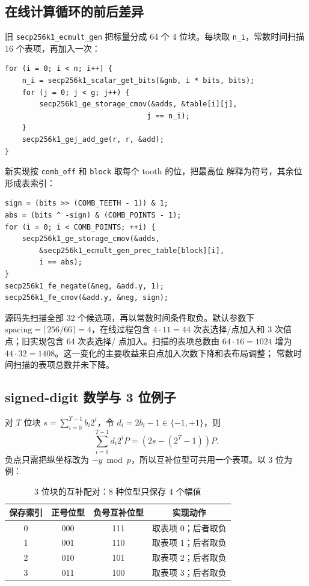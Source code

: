 \documentclass[UTF8,a4paper,zihao=-4]{ctexart}
\begin{document}
\subsection{在线计算循环的前后差异}

旧 \texttt{secp256k1\_ecmult\_gen} 把标量分成 64 个 4 位块。每块取
\texttt{n\_i}，常数时间扫描 16 个表项，再加入一次：

\begin{lstlisting}[style=CStyle,caption={合入前 ecmult\_gen 的核心循环（源码摘录）}]
for (i = 0; i < n; i++) {
    n_i = secp256k1_scalar_get_bits(&gnb, i * bits, bits);
    for (j = 0; j < g; j++) {
        secp256k1_ge_storage_cmov(&adds, &table[i][j],
                                 j == n_i);
    }
    secp256k1_gej_add_ge(r, r, &add);
}
\end{lstlisting}

新实现按 \texttt{comb\_off} 和 \texttt{block} 取每个 tooth 的位，把最高位
解释为符号，其余位形成表索引：

\begin{lstlisting}[style=CStyle,caption={合入后 signed-digit 查表的关键源码}]
sign = (bits >> (COMB_TEETH - 1)) & 1;
abs = (bits ^ -sign) & (COMB_POINTS - 1);
for (i = 0; i < COMB_POINTS; ++i) {
    secp256k1_ge_storage_cmov(&adds,
        &secp256k1_ecmult_gen_prec_table[block][i],
        i == abs);
}
secp256k1_fe_negate(&neg, &add.y, 1);
secp256k1_fe_cmov(&add.y, &neg, sign);
\end{lstlisting}

源码先扫描全部 32 个候选项，再以常数时间条件取负。默认参数下
\(\mathrm{spacing}=\lceil256/66\rceil=4\)，在线过程包含
\(4\cdot11=44\) 次表选择/点加入和 3 次倍点；旧实现包含 64 次表选择/
点加入。扫描的表项总数由 \(64\cdot16=1024\) 增为
\(44\cdot32=1408\)。这一变化的主要收益来自点加入次数下降和表布局调整；
常数时间扫描的表项总数并未下降。

\subsection{signed-digit 数学与 3 位例子}

对 \(T\) 位块 \(s=\sum_{i=0}^{T-1}b_i2^i\)，令
\(d_i=2b_i-1\in\{-1,+1\}\)，则
\begin{equation}
\sum_{i=0}^{T-1}d_i2^iP
=\left(2s-(2^T-1)\right)P .
\end{equation}
负点只需把纵坐标改为 \(-y\bmod p\)，所以互补位型可共用一个表项。以
3 位为例：

\begin{table}[H]
\centering
\caption{3 位块的互补配对：8 种位型只保存 4 个幅值}
\small
\begin{tabular}{cccc}
\toprule
保存索引 & 正号位型 & 负号互补位型 & 实现动作\\
\midrule
0 & 000 & 111 & 取表项 0；后者取负\\
1 & 001 & 110 & 取表项 1；后者取负\\
2 & 010 & 101 & 取表项 2；后者取负\\
3 & 011 & 100 & 取表项 3；后者取负\\
\bottomrule
\end{tabular}
\end{table}
\end{document}
